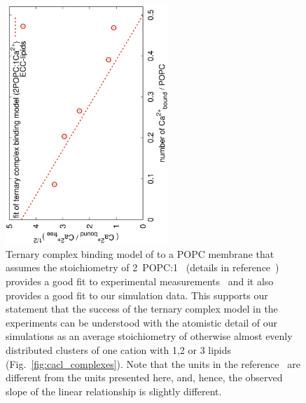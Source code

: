 \documentclass[aip,jcp,twocolumn]{revtex4}
\begin{document}
\begin{figure}[tbp]
  \centering
  \includegraphics[height=9.0cm,angle=-90]{../Fig/bound-CAs_conc-eccl17.eps}
  \caption{\label{fig:cacl-bind}
    Ternary complex binding model of  to a POPC membrane 
    that assumes the stoichiometry of 2~POPC:1~ (details in reference~) 
    provides a good fit to experimental measurements~\cite{altenbach84}
    and it also provides a good fit to our simulation data. 
    This supports our statement that the success of the ternary complex model in the experiments
    can be understood with the atomistic detail of our simulations as an average 
    stoichiometry of otherwise almost evenly distributed clusters of one cation with 1,2 or 3 lipids (Fig.~\ref{fig:cacl_complexes}). 
    Note that the units in the reference~ are different from the units presented here,
    and, hence, the observed slope of the linear relationship is slightly different.
    }
\end{figure}
\end{document}
